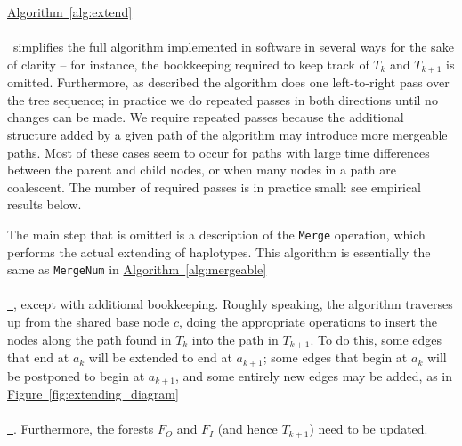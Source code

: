 \documentclass[10pt,twoside,lineno]{gsajnl}
\newcommand{\tskit}{\texttt{tskit}}
\newcommand{\algorithmref}[2][]{%
	\hyperref[{#2}]{%
		Algorithm~\ref*{#2}%
		\ifx\\#1\\%
		\else
		\,#1%
		\fi
	}%
}
\newcommand*{\figref}[2][]{%
	\hyperref[{#2}]{%
		Figure~\ref*{#2}%
		\ifx\\#1\\%
		\else
		\,#1%
		\fi
	}%
}
\begin{document}
\algorithmref{alg:extend} simplifies the full algorithm implemented in software %
in several ways for the sake of clarity --
for instance, the bookkeeping required to keep track of $T_k$ and $T_{k+1}$ is omitted.
Furthermore, as described the algorithm does one left-to-right pass over the tree sequence;
in practice we do repeated passes in both directions until no changes can be made.
We require repeated passes because the additional structure added by a given path of the algorithm
may introduce more mergeable paths.
Most of these cases seem to occur for paths
with large time differences between the parent and child nodes,
or when many nodes in a path are coalescent. 
The number of required passes is in practice small:
see empirical results below.

The main step that is omitted is a description of the \texttt{Merge} operation,
which performs the actual extending of haplotypes.
This algorithm is essentially the same as \texttt{MergeNum} in \algorithmref{alg:mergeable},
except with additional bookkeeping.
Roughly speaking, the algorithm
traverses up from the shared base node $c$,
doing the appropriate operations to insert the nodes along the path found in $T_k$
into the path in $T_{k+1}$.
To do this, some edges that end at $a_k$ will be extended to end at $a_{k+1}$;
some edges that begin at $a_k$ will be postponed to begin at $a_{k+1}$,
and some entirely new edges may be added, as in \figref{fig:extending_diagram}.
Furthermore, the forests $F_O$ and $F_I$ (and hence $T_{k+1}$)
need to be updated. 
\end{document}
